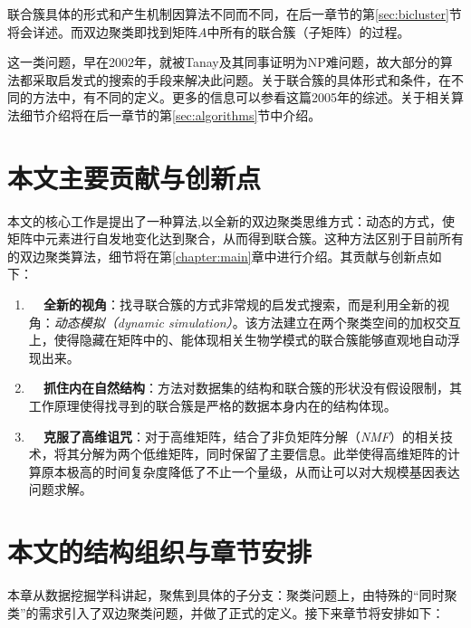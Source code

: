 联合簇具体的形式和产生机制因算法不同而不同，在后一章节的第\ref{sec:bicluster}节将会详述。而双边聚类即找到矩阵$A$中所有的联合簇（子矩阵）的过程。


这一类问题，早在2002年，就被Tanay及其同事\cite{tanay2002discovering}证明为NP难问题，故大部分的算法都采取启发式的搜索的手段来解决此问题。关于联合簇的具体形式和条件，在不同的方法中，有不同的定义。更多的信息可以参看这篇2005年的综述\cite{tanay2005biclustering}。关于相关算法细节介绍将在后一章节的第\ref{sec:algorithms}节中介绍。

\section{本文主要贡献与创新点}
本文的核心工作是提出了一种算法\CoSync{},以全新的双边聚类思维方式：动态的方式，使矩阵中元素进行自发地变化达到聚合，从而得到联合簇。这种方法区别于目前所有的双边聚类算法，细节将在第\ref{chapter:main}章中进行介绍。其贡献与创新点如下：
\begin{enumerate}
  \item \textbf{~~全新的视角}：\CoSync{}找寻联合簇的方式非常规的启发式搜索，而是利用全新的视角：\emph{动态模拟（dynamic simulation）}。该方法建立在两个聚类空间的加权交互上，使得隐藏在矩阵中的、能体现相关生物学模式的联合簇能够直观地自动浮现出来。
  \item \textbf{~~抓住内在自然结构}：\CoSync{}方法对数据集的结构和联合簇的形状没有假设限制，其工作原理使得找寻到的联合簇是严格的数据本身内在的结构体现。
  \item \textbf{~~克服了高维诅咒}：对于高维矩阵，\CoSync{}结合了非负矩阵分解（\emph{NMF}）的相关技术，将其分解为两个低维矩阵，同时保留了主要信息。此举使得高维矩阵的计算原本极高的时间复杂度降低了不止一个量级，从而让\CoSync{}可以对大规模基因表达问题求解。
\end{enumerate}

\section{本文的结构组织与章节安排}
本章从数据挖掘学科讲起，聚焦到具体的子分支：聚类问题上，由特殊的“同时聚类”的需求引入了双边聚类问题，并做了正式的定义。接下来章节将安排如下：

